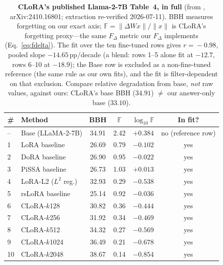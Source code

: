 \documentclass[11pt]{article}
\newcommand{\dw}{F_{\Delta}}
\begin{document}
\begin{table}[t]
  \centering
  \begin{tabular}{llcccc}
    \toprule
    \# & Method & BBH & $\mathbb{F}$ & $\log_{10}\mathbb{F}$ & In fit? \\
    \midrule
    -- & Base (LLaMA-2-7B) & 34.91 & 2.42 & $+0.384$ & no (reference row) \\
    \midrule
    1  & LoRA baseline     & 26.69 & 0.79 & $-0.102$ & yes \\
    2  & DoRA baseline     & 26.90 & 0.95 & $-0.022$ & yes \\
    3  & PiSSA baseline    & 26.73 & 1.03 & $+0.013$ & yes \\
    4  & LoRA-L2 ($L^2$ reg.) & 32.93 & 0.29 & $-0.538$ & yes \\
    5  & rsLoRA baseline   & 25.14 & 0.92 & $-0.036$ & yes \\
    6  & CLoRA-$k$128      & 30.82 & 0.36 & $-0.444$ & yes \\
    7  & CLoRA-$k$256      & 31.92 & 0.34 & $-0.469$ & yes \\
    8  & CLoRA-$k$512      & 34.32 & 0.27 & $-0.569$ & yes \\
    9  & CLoRA-$k$1024     & 36.49 & 0.21 & $-0.678$ & yes \\
    10 & CLoRA-$k$2048     & 38.67 & 0.14 & $-0.854$ & yes \\
    \bottomrule
  \end{tabular}
  \caption{\textbf{CLoRA's published Llama-2-7B Table~4, in full} (from
  \citealp{clora}, arXiv:2410.16801; extraction re-verified 2026-07-11). BBH
  measures forgetting on our exact axis;
  $\mathbb{F}=\lVert\Delta W x\rVert/\lVert x\rVert$
  is CLoRA's forgetting proxy---the same $F_\Delta$ metric our $\dw$ implements
  (Eq.~\ref{eq:fdelta}). The fit over the ten fine-tuned rows gives
  $r\!=\!-0.98$, pooled slope $-14.65$\,pp/decade (a blend: rows 1--5 alone fit
  at $-12.7$, rows 6--10 at $-18.9$); the Base row is excluded as a
  non-fine-tuned reference (the same rule as our own fits), and the fit is
  filter-dependent on that exclusion. Compare relative degradation from base,
  \emph{not} raw values,
  against ours: CLoRA's base BBH ($34.91$) $\neq$ our answer-only base ($33.10$).}
  \label{tab:clora}
\end{table}

\end{document}
